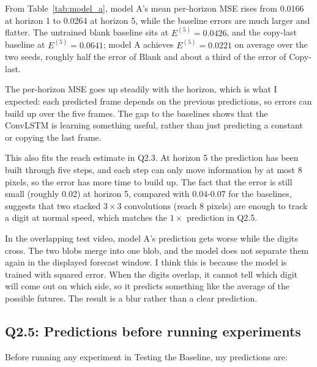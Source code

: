 \documentclass[11pt,letterpaper]{article}
\begin{document}
From Table~\ref{tab:model_a}, model A's mean per-horizon MSE rises from 0.0166 at horizon 1 to 0.0264 at
horizon 5, while the baseline errors are much larger and flatter. The untrained blank
baseline sits at $E^{(5)}=0.0426$, and the copy-last baseline at $E^{(5)}=0.0641$; model A
achieves $E^{(5)}=0.0221$ on average over the two seeds, roughly half the error of Blank
and about a third of the error of Copy-last.

The per-horizon MSE goes up steadily with the horizon, which is what I expected: each predicted
frame depends on the previous predictions, so errors can build up over the five frames. The gap
to the baselines shows that the ConvLSTM is learning something useful, rather than just
predicting a constant or copying the last frame.


This also fits the reach estimate in Q2.3. At horizon 5 the prediction has been built through five
steps, and each step can only move information by at most 8 pixels, so the error has more time to
build up. The fact that the error is still small (roughly 0.02) at horizon 5, compared with
0.04-0.07 for the baselines, suggests that two stacked $3\times3$ convolutions (reach 8 pixels) are
enough to track a digit at normal speed, which matches the $1\times$ prediction in Q2.5.



In the overlapping test video, model A's prediction gets worse while the digits cross. The two
blobs merge into one blob, and the model does not separate them again in the displayed forecast
window. I think this is because the model is trained with squared error. When the digits overlap,
it cannot tell which digit will come out on which side, so it predicts something like the average
of the possible futures. The result is a blur rather than a clear prediction.

\subsection*{Q2.5: Predictions before running experiments}

Before running any experiment in Testing the Baseline, my predictions are:
\end{document}
